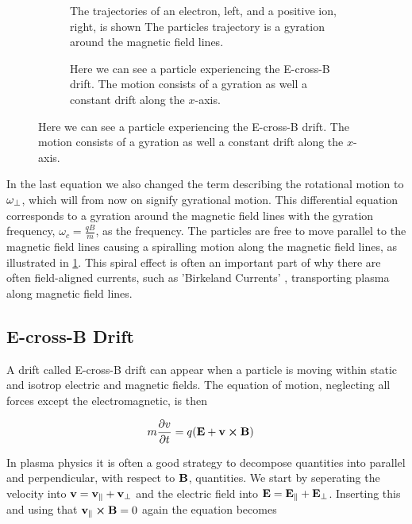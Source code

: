 		\begin{figure}
			\centering
			\begin{subfigure}{0.45\textwidth}
				
				\caption{The trajectories of an electron, left, and a positive ion, right, is shown
				  The particles trajectory is a gyration around the magnetic field lines.}
				\label{fig:gyration}
			\end{subfigure}
			\begin{subfigure}{0.45\textwidth}
				
				\caption{Here we can see a particle experiencing the E-cross-B drift. The motion consists of a gyration
				as well a constant drift along the \(x\)-axis.}
				\label{fig:EcrossB}
			\end{subfigure}
		\end{figure}



		In the last equation we also changed the term describing the rotational motion
		to \(\vb{\omega}_\perp\), which will from now on signify gyrational motion.
		This differential equation corresponds to a gyration around the magnetic field lines
		with the gyration frequency, \(\omega_c = \frac{qB}{m}\), as the frequency. The particles are free to
		move parallel to the magnetic field lines causing a spiralling motion along the magnetic field lines, as illustrated in
		\cref{fig:gyration}. This spiral effect is often an important part of why
		there are often field-aligned currents, such as 'Birkeland Currents' \citep{cummings_field-aligned_1967},
		transporting plasma along magnetic field lines.



	\subsection{E-cross-B Drift}
	A drift called E-cross-B drift can appear when a particle is moving within static and isotrop
	electric and magnetic fields. The equation of motion, neglecting all forces
	except the electromagnetic, is then

	\begin{align}
		m\pdv{v}{t} &= q(\vb{E} + \vb{v}\cross\vb{B}) \label{eq:EcrossB}
	\end{align}

	In plasma physics it is often a good strategy to decompose quantities into
	parallel and perpendicular, with respect to \(\vb{B}\), quantities. We start by seperating the
	velocity into \(\vb{v} = \vb{v}_\parallel + \vb{v}_\perp\) and the electric field
	into \(\vb{E} = \vb{E}_\parallel + \vb{E}_\perp\). Inserting this and using that \(\vb{v}_\parallel\cross\vb{B}=0\)
	again the equation becomes

